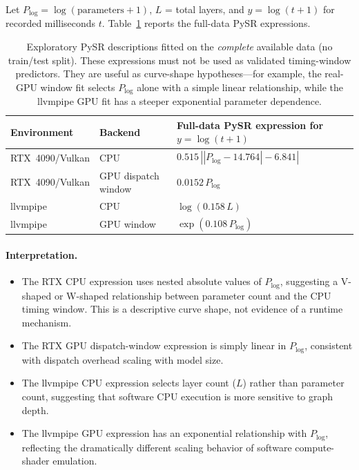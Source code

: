 \documentclass[10pt,twocolumn]{article}
\begin{document}
Let $P_{\log} = \log(\text{parameters} + 1)$, $L$ = total layers, and $y = \log(t + 1)$ for recorded milliseconds $t$. Table~\ref{tab:pysr} reports the full-data PySR expressions.

\begin{table}[t]
\centering\small
\begin{tabular}{lll}
\toprule
Environment & Backend & Full-data PySR expression for $y = \log(t+1)$ \\
\midrule
RTX~4090/Vulkan & CPU & $0.515\,\left|\left|P_{\log} - 14.764\right| - 6.841\right|$ \\
RTX~4090/Vulkan & GPU dispatch window & $0.0152\,P_{\log}$ \\
llvmpipe & CPU & $\log(0.158\,L)$ \\
llvmpipe & GPU window & $\exp(0.108\,P_{\log})$ \\
\bottomrule
\end{tabular}
\caption{Exploratory PySR descriptions fitted on the \emph{complete} available data (no train/test split). These expressions must not be used as validated timing-window predictors. They are useful as curve-shape hypotheses---for example, the real-GPU window fit selects $P_{\log}$ alone with a simple linear relationship, while the llvmpipe GPU fit has a steeper exponential parameter dependence.}
\label{tab:pysr}
\end{table}

\paragraph{Interpretation.}
\begin{itemize}[nosep,leftmargin=*]
  \item The RTX CPU expression uses nested absolute values of $P_{\log}$, suggesting a V-shaped or W-shaped relationship between parameter count and the CPU timing window. This is a descriptive curve shape, not evidence of a runtime mechanism.
  \item The RTX GPU dispatch-window expression is simply linear in $P_{\log}$, consistent with dispatch overhead scaling with model size.
  \item The llvmpipe CPU expression selects layer count ($L$) rather than parameter count, suggesting that software CPU execution is more sensitive to graph depth.
  \item The llvmpipe GPU expression has an exponential relationship with $P_{\log}$, reflecting the dramatically different scaling behavior of software compute-shader emulation.
\end{itemize}
\end{document}
